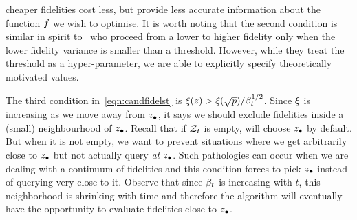 cheaper fidelities cost less, but provide less accurate information about the
function $f$ we wish to optimise.
% 
It is worth noting that the second condition is similar in
spirit to~\citet{kandasamy16mfbo} who proceed from a lower to higher
fidelity only when the lower fidelity variance is smaller than a threshold.
However, while they treat the threshold as a hyper-parameter, we are able to explicitly
specify theoretically motivated values.


The third condition in~\eqref{eqn:candfidelst} is
$\xi(z) > \xi(\sqrt{p})/\beta^{1/2}_t$. 
Since $\xi$ is increasing as we move away from
$z_{\bullet}$, it says we should exclude fidelities inside a (small) neighbourhood of $z_{\bullet}$.
Recall that if $\mathcal{Z}_t$ is empty, \boca{} will choose $z_{\bullet}$ by default.
But when it is not empty, we want to prevent situations where we get
arbitrarily close to
$z_{\bullet}$ but not actually query \emph{at} $z_{\bullet}$.
Such pathologies can occur when we are dealing with a continuum of fidelities and
this condition forces \bocas to pick $z_{\bullet}$ instead of querying very close to it.
Observe that since $\beta_t$ is increasing with $t$, this neighborhood is shrinking with time
and therefore the algorithm will eventually have the opportunity to evaluate fidelities
close to $z_{\bullet}$.

